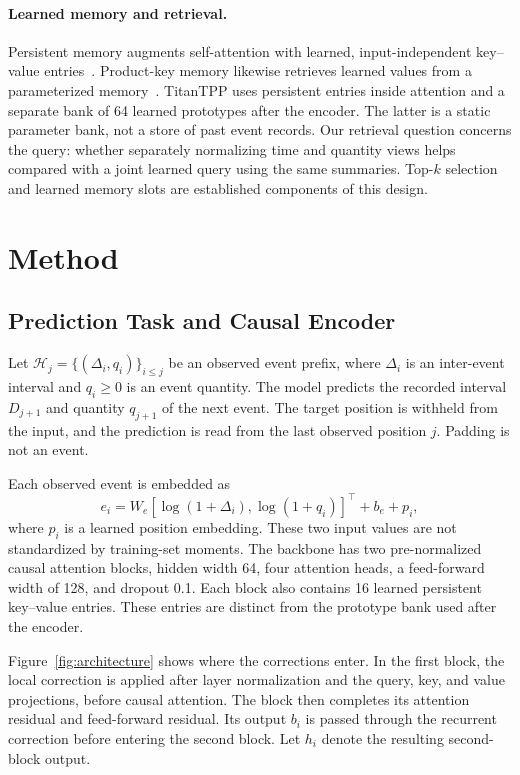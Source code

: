 \documentclass[runningheads]{llncs}
\newcommand{\method}{TitanTPP}
\newcommand{\Hcal}{\mathcal{H}}
\begin{document}
\paragraph{Learned memory and retrieval.}
Persistent memory augments self-attention with learned, input-independent key--value entries~\cite{sukhbaatar2019memory}. Product-key memory likewise retrieves learned values from a parameterized memory~\cite{lample2019product}. \method{} uses persistent entries inside attention and a separate bank of 64 learned prototypes after the encoder. The latter is a static parameter bank, not a store of past event records. Our retrieval question concerns the query: whether separately normalizing time and quantity views helps compared with a joint learned query using the same summaries. Top-$k$ selection and learned memory slots are established components of this design.

\section{Method}
\subsection{Prediction Task and Causal Encoder}
Let $\Hcal_j=\{(\Delta_i,q_i)\}_{i\leq j}$ be an observed event prefix, where $\Delta_i$ is an inter-event interval and $q_i\geq0$ is an event quantity. The model predicts the recorded interval $D_{j+1}$ and quantity $q_{j+1}$ of the next event. The target position is withheld from the input, and the prediction is read from the last observed position $j$. Padding is not an event.

Each observed event is embedded as
\begin{equation}
 e_i=W_e[\log(1+\Delta_i),\log(1+q_i)]^\top+b_e+p_i,
\end{equation}
where $p_i$ is a learned position embedding. These two input values are not standardized by training-set moments. The backbone has two pre-normalized causal attention blocks, hidden width 64, four attention heads, a feed-forward width of 128, and dropout 0.1. Each block also contains 16 learned persistent key--value entries. These entries are distinct from the prototype bank used after the encoder.

Figure~\ref{fig:architecture} shows where the corrections enter. In the first block, the local correction is applied after layer normalization and the query, key, and value projections, before causal attention. The block then completes its attention residual and feed-forward residual. Its output $b_i$ is passed through the recurrent correction before entering the second block. Let $h_i$ denote the resulting second-block output.
\end{document}
